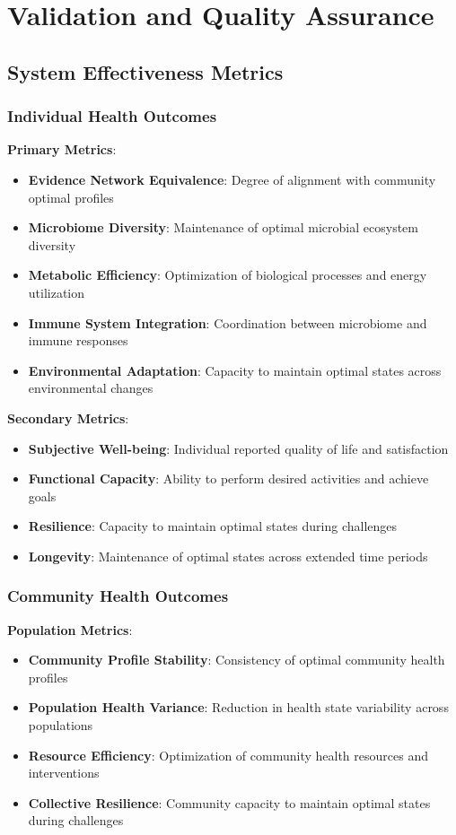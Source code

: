 \documentclass[12pt,a4paper]{article}
\begin{document}
\section{Validation and Quality Assurance}

\subsection{System Effectiveness Metrics}

\subsubsection{Individual Health Outcomes}

\textbf{Primary Metrics}:
\begin{itemize}
\item \textbf{Evidence Network Equivalence}: Degree of alignment with community optimal profiles
\item \textbf{Microbiome Diversity}: Maintenance of optimal microbial ecosystem diversity
\item \textbf{Metabolic Efficiency}: Optimization of biological processes and energy utilization
\item \textbf{Immune System Integration}: Coordination between microbiome and immune responses
\item \textbf{Environmental Adaptation}: Capacity to maintain optimal states across environmental changes
\end{itemize}

\textbf{Secondary Metrics}:
\begin{itemize}
\item \textbf{Subjective Well-being}: Individual reported quality of life and satisfaction
\item \textbf{Functional Capacity}: Ability to perform desired activities and achieve goals
\item \textbf{Resilience}: Capacity to maintain optimal states during challenges
\item \textbf{Longevity}: Maintenance of optimal states across extended time periods
\end{itemize}

\subsubsection{Community Health Outcomes}

\textbf{Population Metrics}:
\begin{itemize}
\item \textbf{Community Profile Stability}: Consistency of optimal community health profiles
\item \textbf{Population Health Variance}: Reduction in health state variability across populations
\item \textbf{Resource Efficiency}: Optimization of community health resources and interventions
\item \textbf{Collective Resilience}: Community capacity to maintain optimal states during challenges
\end{itemize}
\end{document}
